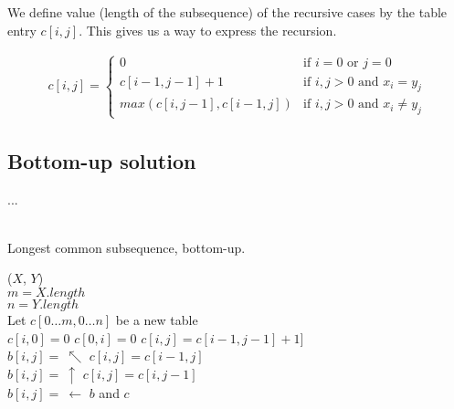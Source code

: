 We define value (length of the subsequence) of the recursive cases by the
table entry $c[i,j]$. This gives us a way to express the recursion.

\begin{align}
	c[i,j] =
	\begin{cases}
		0 & \mbox{if $i = 0$ or $j = 0$} \\
		c[i - 1, j - 1] + 1 & \mbox{if $i, j > 0$ and $x_i = y_j$} \\
		max(c[i, j-1], c[i-1, j]) & \mbox{if $i, j > 0$ and $x_i \neq y_j$}
	\end{cases}
\end{align}

\newpage
\subsection{Bottom-up solution}
...
\\\\
\begin{algorithm}[H]
	\caption{Longest common subsequence, bottom-up.}
	\label{alg:lcs-bottom-up}
	
	
	
	
	\BlankLine
	\LCS($X$, $Y$) \\
	\Begin
	{
		$m = X.length$ \\
		$n = Y.length$ \\
		Let $c[0 \dots m, 0 \dots n]$ be a new table \\
		{
			$c[i, 0] = 0$
		}
		{
			$c[0, i] = 0$
		}
		{
			{
				{
					$c[i, j] = c[i-1,j-1] + 1]$ \\
					$b[i, j] ={\ }\nwarrow$
				}
				{
					$c[i, j] = c[i-1, j]$ \\
					$b[i, j] ={\ }\uparrow$
				}
				\Else
				{
					$c[i, j] = c[i, j-1]$ \\
					$b[i, j] ={\ }\leftarrow$
				}
			}
		}
		\Return $b$ and $c$
	}
\end{algorithm}

\newpage %
